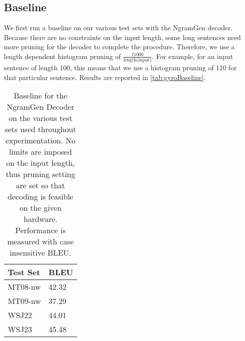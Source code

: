 \subsection{Baseline}
\label{sec:gyroBaseline}

We first run a baseline on our various test sets with the NgramGen decoder.
Because there are no constraints on the input length, some long sentences
need more pruning for the decoder to complete the procedure.
Therefore, we use a length dependent histogram pruning of
$\frac{11000}{\text{length(input)}}$. For example, for an input sentence
of length 100, this means that we use a histogram pruning of 110 for that
particular sentence. Results are reported in \autoref{tab:gyroBaseline}.
%
\begin{table}
  \begin{center}
  \begin{tabular}{l|l}
    Test Set & BLEU \\
    \hline
    MT08-nw & 42.32 \\
    MT09-nw & 37.29 \\
    WSJ22 & 44.01 \\
    WSJ23 & 45.48 \\
  \end{tabular}
  \caption{Baseline for the NgramGen Decoder on the various test sets used throughout experimentation. No
    limits are imposed on the input length, thus pruning setting are set so that decoding is feasible on
    the given hardware. Performance is measured with case insensitive BLEU.}
  \label{tab:gyroBaseline}
  \end{center}
\end{table}


